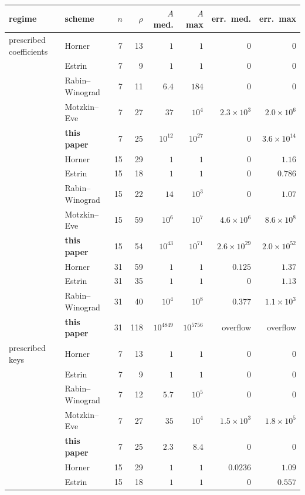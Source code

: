 \begin{table}[htbp]
\centering\footnotesize
\begin{tabular}{@{}llrrrrrr@{}}
\toprule
regime & scheme & $n$ & $\rho$ & $A$ med. & $A$ max & err.\ med. & err.\ max \\
\midrule
prescribed coefficients & Horner & 7 & 13 & $1$ & $1$ & $0$ & $0$ \\
 & Estrin & 7 & 9 & $1$ & $1$ & $0$ & $0$ \\
 & Rabin--Winograd & 7 & 11 & $6.4$ & $184$ & $0$ & $0$ \\
 & Motzkin--Eve & 7 & 27 & $37$ & $10^{4}$ & $2.3\times10^{3}$ & $2.0\times10^{6}$ \\
 & \textbf{this paper} & 7 & 25 & $10^{12}$ & $10^{27}$ & $0$ & $3.6\times10^{14}$ \\
\addlinespace[2pt]
 & Horner & 15 & 29 & $1$ & $1$ & $0$ & $1.16$ \\
 & Estrin & 15 & 18 & $1$ & $1$ & $0$ & $0.786$ \\
 & Rabin--Winograd & 15 & 22 & $14$ & $10^{3}$ & $0$ & $1.07$ \\
 & Motzkin--Eve & 15 & 59 & $10^{6}$ & $10^{7}$ & $4.6\times10^{6}$ & $8.6\times10^{8}$ \\
 & \textbf{this paper} & 15 & 54 & $10^{43}$ & $10^{71}$ & $2.6\times10^{29}$ & $2.0\times10^{52}$ \\
\addlinespace[2pt]
 & Horner & 31 & 59 & $1$ & $1$ & $0.125$ & $1.37$ \\
 & Estrin & 31 & 35 & $1$ & $1$ & $0$ & $1.13$ \\
 & Rabin--Winograd & 31 & 40 & $10^{4}$ & $10^{8}$ & $0.377$ & $1.1\times10^{3}$ \\
 & \textbf{this paper} & 31 & 118 & $10^{4849}$ & $10^{5756}$ & overflow & overflow \\
\addlinespace[2pt]
\midrule
prescribed keys & Horner & 7 & 13 & $1$ & $1$ & $0$ & $0$ \\
 & Estrin & 7 & 9 & $1$ & $1$ & $0$ & $0$ \\
 & Rabin--Winograd & 7 & 12 & $5.7$ & $10^{5}$ & $0$ & $0$ \\
 & Motzkin--Eve & 7 & 27 & $35$ & $10^{4}$ & $1.5\times10^{3}$ & $1.8\times10^{5}$ \\
 & \textbf{this paper} & 7 & 25 & $2.3$ & $8.4$ & $0$ & $0$ \\
\addlinespace[2pt]
 & Horner & 15 & 29 & $1$ & $1$ & $0.0236$ & $1.09$ \\
 & Estrin & 15 & 18 & $1$ & $1$ & $0$ & $0.557$ \\

\end{tabular}
\end{table}

